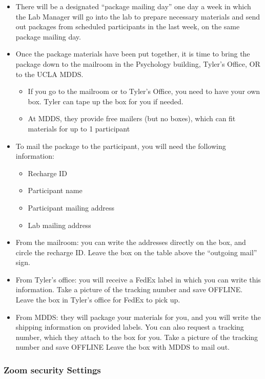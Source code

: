 \documentclass[
]{book}
\providecommand{\tightlist}{%
  \setlength{\itemsep}{0pt}\setlength{\parskip}{0pt}}
\begin{document}
\begin{itemize}
\tightlist
\item
  There will be a designated ``package mailing day'' one day a week in which the Lab Manager will go into the lab to prepare necessary materials and send out packages from scheduled participants in the last week, on the same package mailing day.
\item
  Once the package materials have been put together, it is time to bring the package down to the mailroom in the Psychology building, Tyler's Office, OR to the UCLA MDDS.

  \begin{itemize}
  \tightlist
  \item
    If you go to the mailroom or to Tyler's Office, you need to have your own box. Tyler can tape up the box for you if needed.
  \item
    At MDDS, they provide free mailers (but no boxes), which can fit materials for up to 1 participant
  \end{itemize}
\item
  To mail the package to the participant, you will need the following information:

  \begin{itemize}
  \tightlist
  \item
    Recharge ID
  \item
    Participant name
  \item
    Participant mailing address
  \item
    Lab mailing address
  \end{itemize}
\item
  From the mailroom: you can write the addresses directly on the box, and circle the recharge ID. Leave the box on the table above the ``outgoing mail'' sign.
\item
  From Tyler's office: you will receive a FedEx label in which you can write this information. Take a picture of the tracking number and save OFFLINE. Leave the box in Tyler's office for FedEx to pick up.
\item
  From MDDS: they will package your materials for you, and you will write the shipping information on provided labels. You can also request a tracking number, which they attach to the box for you. Take a picture of the tracking number and save OFFLINE Leave the box with MDDS to mail out.
\end{itemize}

\hypertarget{zoom-security-settings}{%
\subsubsection{Zoom security Settings}\label{zoom-security-settings}}
\end{document}
